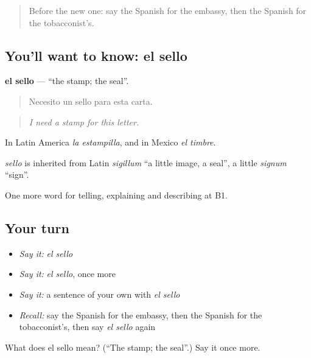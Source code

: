 \begin{quote}
Before the new one: say the Spanish for the embassy, then the Spanish for the tobacconist’s.
\end{quote}

\subsection*{You'll want to know: el sello}
\textbf{el sello} — \textquotedblleft{}the stamp; the seal\textquotedblright{}.

\begin{quote}
Necesito un sello para esta carta.
\end{quote}

\begin{quote}
\emph{I need a stamp for this letter.}
\end{quote}

In Latin America \emph{la estampilla}, and in Mexico \emph{el timbre}.

\begin{cousinweb}
\emph{sello} is inherited from Latin \emph{sigillum} \textquotedblleft{}a little image, a seal\textquotedblright{}, a little \emph{signum} \textquotedblleft{}sign\textquotedblright{}.
\end{cousinweb}

\begin{grammarlens}[title={What you've built}]
One more word for telling, explaining and describing at B1.
\end{grammarlens}

\subsection*{Your turn}
\begin{itemize}
\raggedright
  \item \emph{Say it:} \emph{el sello}
  \item \emph{Say it:} \emph{el sello}, once more
  \item \emph{Say it:} a sentence of your own with \emph{el sello}
  \item \emph{Recall:} say the Spanish for the embassy, then the Spanish for the tobacconist’s, then say \emph{el sello} again
\end{itemize}

\begin{tcolorbox}[breakable,colback=teal!4,colframe=teal!35!black,title={Before you move on}]
What does el sello mean? (\textquotedblleft{}The stamp; the seal\textquotedblright{}.) Say it once more.
\end{tcolorbox}
